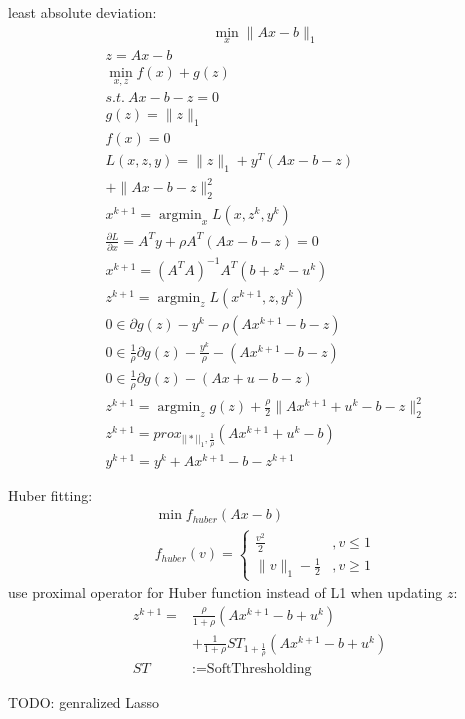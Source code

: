 \documentclass[8pt]{report}
\DeclareMathOperator*{\argmin}{argmin}
\newcommand{\norm}[1]{\|#1\|}
\begin{document}
\begin{multicols*}{2}
  least absolute deviation:
  \begin{align*}
    &\min_x \norm{Ax-b}_1
  \end{align*}
  \begin{align*}
    &z=Ax-b\\
    &\min_{x,z} f(x) + g(z)\\
    &s.t.\ Ax-b-z=0\\
    &g(z) = \norm{z}_1\\
    &f(x) = 0\\
    &L(x,z,y)=\norm{z}_1 + y^T(Ax-b-z)\\
    &+ \norm{Ax-b-z}_2^2\\
    &x^{k+1}=\argmin_x L(x,z^k,y^k)\\
    &\frac{\partial L}{\partial x}=A^T y + \rho A^T(Ax-b-z)=0\\
    &x^{k+1}=(A^T A)^{-1}A^T(b+z^k-u^k)\\
    &z^{k+1}=\argmin_z L(x^{k+1},z,y^k)\\
    &0 \in \partial g(z) -y^k - \rho(Ax^{k+1}-b-z)\\
    &0 \in \frac{1}{\rho} \partial g(z) -\frac{y^k}{\rho} - (Ax^{k+1}-b-z)\\
    &0 \in \frac{1}{\rho} \partial g(z) - (Ax+u-b-z)\\
    &z^{k+1} = \argmin_z g(z) + \frac{\rho}{2}\norm{Ax^{k+1}+u^k-b-z}_2^2\\
    &z^{k+1} = prox_{||*||_1, \frac{1}{\rho}}(Ax^{k+1}+u^k-b)\\
    &y^{k+1}=y^k + Ax^{k+1}-b-z^{k+1}
  \end{align*}

  Huber fitting:
  \begin{align*}
    &\min f_{huber}(Ax-b)\\
    &f_{huber}(v) =
    \begin{cases}
      \frac{v^2}{2} &, v \leq 1\\
      \norm{v}_1 - \frac{1}{2} &, v \ge 1
    \end{cases}
  \end{align*}
  use proximal operator for Huber function instead of L1 when updating $z$:
  \begin{align*}
    z^{k+1}=&\frac{\rho}{1+\rho}(Ax^{k+1}-b+u^k)\\
            &+\frac{1}{1+\rho}ST_{1+\frac{1}{\rho}}(Ax^{k+1}-b+u^k)\\
    ST &:= \text{SoftThresholding}
  \end{align*}
  
  TODO: genralized Lasso


\end{multicols*}
\end{document}
